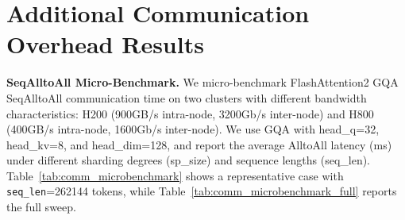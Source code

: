 \section{Additional Communication Overhead Results}\label{appendix:comm_overhead}
\noindent\textbf{SeqAlltoAll Micro-Benchmark.}
We micro-benchmark FlashAttention2 GQA SeqAlltoAll communication time on two clusters with different bandwidth characteristics: H200 (900GB/s intra-node, 3200Gb/s inter-node) and H800 (400GB/s intra-node, 1600Gb/s inter-node). We use GQA with head\_q=32, head\_kv=8, and head\_dim=128, and report the average AlltoAll latency (ms) under different sharding degrees (sp\_size) and sequence lengths (seq\_len). Table~\ref{tab:comm_microbenchmark} shows a representative case with \texttt{seq\_len}=262144 tokens, while Table~\ref{tab:comm_microbenchmark_full} reports the full sweep.
\begin{table}[h]
    \centering
    \caption{SeqAlltoAll micro-benchmark communication latency (ms) in FlashAttention2 GQA.}
    \label{tab:comm_microbenchmark}
\end{table}

